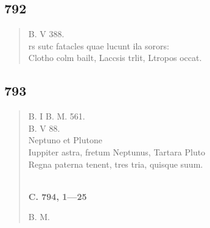 \documentclass[11pt, a4paper]{report}
\begin{document}
            \subsection*{792}
      \begin{verse}
      B. V 388. \\ rs sutc fatacles quae lucunt ila sorors: \\ Clotho colm bailt, Laccsis trlit, Ltropos occat. \\ 
      \end{verse}
  
            \subsection*{793}
      \begin{verse}
      B. I B. M. 561. \\ B. V 88. \\ Neptuno et Plutone \\ Iuppiter astra, fretum Neptunus, Tartara Pluto \\ Regna paterna tenent, tres tria, quisque suum. \\ 
        ﻿\pagebreak 
    \begin{center} \textbf{C. 794, 1—25} \end{center} \marginpar{[07]} B. M. \\ 
      \end{verse}
  
\end{document}
